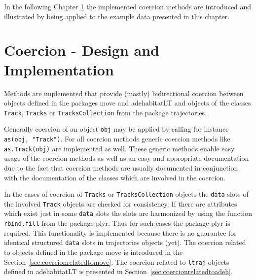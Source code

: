 \documentclass[12pt, oneside, a4paper]{scrbook}
\newcommand{\pkg}[1]{{\normalfont\fontseries{b}\selectfont #1}}
\let\code=\texttt
\newcommand{\codeintitles}[1]{{\tt #1}} %
\begin{document}
In the following Chapter \ref{chap:coercion} the implemented coercion methods are introduced and illustrated by being applied to the example data presented in this chapter.



%
%
\chapter{Coercion - Design and Implementation}
\label{chap:coercion}

Methods are implemented that provide (mostly) bidirectional coercion between objects defined in the packages \pkg{move} and \pkg{adehabitatLT} and objects of the classes \code{Track}, \code{Tracks} or \code{TracksCollection} from the package \pkg{trajectories}.
\par\medskip

Generally coercion of an object \code{obj} may be applied by calling for instance \code{as(obj, "Track")}.
For all coercion methods generic coercion methods like \code{as.Track(obj)} are implemented as well. These generic methods enable easy usage of the coercion methods as well as an easy and appropriate documentation due to the fact that coercion methods are usually documented in conjunction with the documentation of the classes which are involved in the coercion.
\par\medskip

In the cases of coercion of \code{Tracks} or \code{TracksCollection} objects the \code{data} slots of the involved \code{Track} objects are checked for consistency. If there are attributes which exist just in some \code{data} slots the slots are harmonized by using the function \code{rbind.fill} from the package \pkg{plyr}. 
Thus for such cases the package \pkg{plyr} is required. 
This functionality is implemented because there is no guarantee for identical structured \code{data} slots in \pkg{trajectories} objects (yet). The coercion related to objects defined in the package \pkg{move} is introduced in the Section~\ref{sec:coercionrelatedtomove}. The coercion related to \code{ltraj} objects defined in \pkg{adehabitatLT} is presented in Section~\ref{sec:coercionrelatedtoadeh}.
\par\medskip
\end{document}
